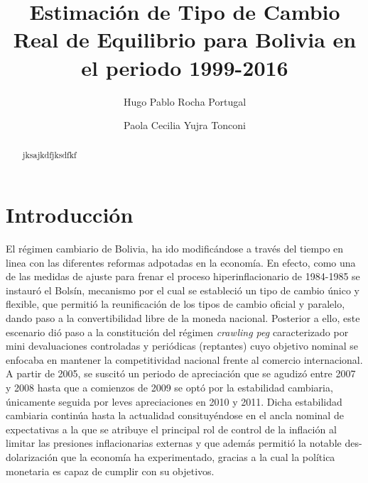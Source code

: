 \documentclass[12pt,letterpaper]{article}
\title{Estimación de Tipo de Cambio Real de Equilibrio para Bolivia en el periodo 1999-2016}
\author{Hugo Pablo Rocha Portugal \and Paola Cecilia Yujra Tonconi}
\date{}
\begin{document}
 

\maketitle 

\begin{abstract}
jksajkdfjksdfkf
\end{abstract}

\newpage

\section{Introducción}

El régimen cambiario de Bolivia, ha ido modificándose a través del tiempo en linea con las diferentes reformas adpotadas en la economía.  En efecto, como una de las medidas de ajuste para frenar el proceso hiperinflacionario de 1984-1985 se instauró el Bolsín, mecanismo por el cual se estableció un tipo de cambio único y flexible, que permitió la reunificación de los tipos de cambio oficial y paralelo, dando paso a la convertibilidad libre de la moneda nacional. Posterior a ello, este escenario dió paso a la constitución del régimen \emph{crawling peg} caracterizado por mini devaluaciones controladas y periódicas (reptantes) cuyo objetivo nominal se enfocaba en  mantener la competitividad nacional frente al comercio internacional. A partir de 2005, se suscitó un periodo de apreciación que se agudizó entre 2007 y 2008 hasta que a comienzos de 2009 se optó por la estabilidad cambiaria, únicamente seguida por leves apreciaciones en 2010 y 2011. Dicha estabilidad cambiaria continúa hasta la actualidad consituyéndose en el ancla nominal de expectativas a la que se atribuye el principal rol de control de la inflación al limitar las presiones inflacionarias externas y que además permitió la notable des-dolarización que la economía ha experimentado, gracias a la cual la política monetaria es capaz de cumplir con su objetivos.
\end{document}
